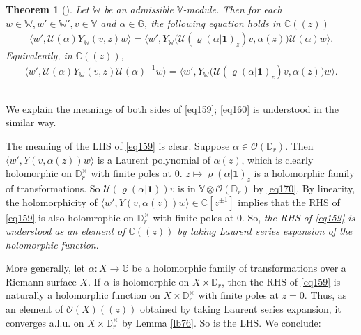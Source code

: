 \documentclass[11pt,b5paper,notitlepage]{article}
\theoremstyle{definition}
\theoremstyle{plain}
\newtheorem{thm}[df]{Theorem}
\newcommand{\mc}{\mathcal}
\newcommand{\id}{\mathbf{1}}
\newcommand{\bk}[1]{\langle {#1}\rangle}
\newcommand{\bigbk}[1]{\big\langle {#1}\big\rangle}
\newcommand{\scr}{\mathscr}
\newcommand{\Vbb}{\mathbb V}
\newcommand{\Wbb}{\mathbb W}
\newcommand{\Gbb}{\mathbb G}
\newcommand{\Cbb}{\mathbb C}
\newcommand{\Dbb}{\mathbb D}
\numberwithin{equation}{section}
\begin{document}

\begin{thm}[\cite{Hua97}]\label{lb93}
Let $\Wbb$ be an admissible $\Vbb$-module. Then for each $w\in\Wbb,w'\in\Wbb',v\in\Vbb$ and $\alpha\in\Gbb$, the following equation holds in $\Cbb((z))$
\begin{align}
\bk{w',\mc U(\alpha)Y_\Wbb(v,z)w}=\bigbk{w',Y_\Wbb\big(\mc U(\varrho(\alpha|\id)_z)v,\alpha(z)\big)\mc U(\alpha)w}.\label{eq159}
\end{align}
Equivalently, in $\Cbb((z))$,
\begin{align}
\bk{w',\mc U(\alpha)Y_\Wbb(v,z)\mc U(\alpha)^{-1}w}=\bigbk{w',Y_\Wbb\big(\mc U(\varrho(\alpha|\id)_z)v,\alpha(z)\big)w}.\label{eq160}
\end{align}
\end{thm}




\subsection{}

We explain the meanings of  both sides of \eqref{eq159}; \eqref{eq160} is understood in the similar way. 

The meaning of the LHS of \eqref{eq159} is clear. Suppose $\alpha\in\scr O(\Dbb_r)$. Then
$\bk{w',Y(v,\alpha(z))w}$ is  a Laurent polynomial of $\alpha(z)$, which is clearly holomorphic on $\Dbb_r^\times$ with finite poles at $0$. $z\mapsto \varrho(\alpha|\id)_z$ is a holomorphic family of transformations. So $\mc U(\varrho(\alpha|\id))v$ is in $\Vbb\otimes\scr O(\Dbb_r)$ by \eqref{eq170}. By linearity, the holomorphicity of $\bk{w',Y(v,\alpha(z))w}\in \Cbb[z^{\pm1}]$ implies that the RHS of \eqref{eq159} is also holomrophic on  $\Dbb_r^\times$ with finite poles at $0$. So, \emph{the RHS of \eqref{eq159} is understood as an element of $\Cbb((z))$ by taking Laurent series expansion of the holomorphic function}.

More generally, let $\alpha:X\rightarrow\Gbb$ be a holomorphic family of transformations over a Riemann surface $X$. If $\alpha$ is holomorphic on $X\times\Dbb_r$, then the RHS of \eqref{eq159} is naturally a holomorphic function on $X\times \Dbb_r^\times$ with finite poles at $z=0$. Thus, as an element of $\scr O(X)((z))$ obtained by taking Laurent series expansion, it converges a.l.u. on $X\times \Dbb_r^{\times}$ by Lemma \ref{lb76}. So is the LHS. We conclude:
\end{document}
